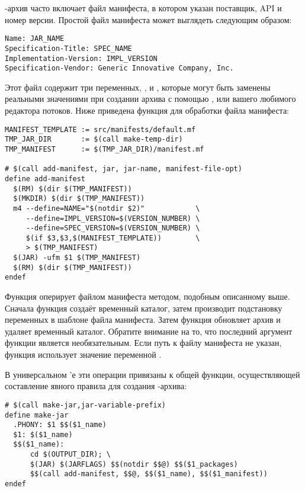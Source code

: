 \Java{}\hyp{}архив часто включает файл манифеста, в котором указан
поставщик, API и номер версии. Простой файл манифеста может выглядеть
следующим образом:

{\footnotesize
\begin{verbatim}
Name: JAR_NAME
Specification-Title: SPEC_NAME
Implementation-Version: IMPL_VERSION
Specification-Vendor: Generic Innovative Company, Inc.
\end{verbatim}
}

Этот файл содержит три переменных, ,
 и , которые могут быть
заменены реальными значениями при создании архива с помощью
,  или вашего любимого редактора потоков.
Ниже приведена функция для обработки файла манифеста:

{\footnotesize
\begin{verbatim}
MANIFEST_TEMPLATE := src/manifests/default.mf
TMP_JAR_DIR       := $(call make-temp-dir)
TMP_MANIFEST      := $(TMP_JAR_DIR)/manifest.mf

# $(call add-manifest, jar, jar-name, manifest-file-opt)
define add-manifest
  $(RM) $(dir $(TMP_MANIFEST))
  $(MKDIR) $(dir $(TMP_MANIFEST))
  m4 --define=NAME="$(notdir $2)"            \
     --define=IMPL_VERSION=$(VERSION_NUMBER) \
     --define=SPEC_VERSION=$(VERSION_NUMBER) \
     $(if $3,$3,$(MANIFEST_TEMPLATE))        \
     > $(TMP_MANIFEST)
  $(JAR) -ufm $1 $(TMP_MANIFEST)
  $(RM) $(dir $(TMP_MANIFEST))
endef
\end{verbatim}
}

Функция  оперирует файлом манифеста
методом, подобным описанному выше. Сначала функция создаёт временный
каталог, затем производит подстановку переменных в шаблоне файла
манифеста. Затем функция обновляет архив и удаляет временный каталог.
Обратите внимание на то, что последний аргумент функции является
необязательным. Если путь к файлу манифеста не указан, функция
использует значение переменной \variable{MANIFEST\_TEMPLATE}.

В универсальном \Makefile{}'е эти операции привязаны к общей функции,
осуществляющей составление явного правила для создания
\Java{}\hyp{}архива:

{\footnotesize
\begin{verbatim}
# $(call make-jar,jar-variable-prefix)
define make-jar
  .PHONY: $1 $$($1_name)
  $1: $($1_name)
  $$($1_name):
      cd $(OUTPUT_DIR); \
      $(JAR) $(JARFLAGS) $$(notdir $$@) $$($1_packages)
      $$(call add-manifest, $$@, $$($1_name), $$($1_manifest))
endef
\end{verbatim}
}


